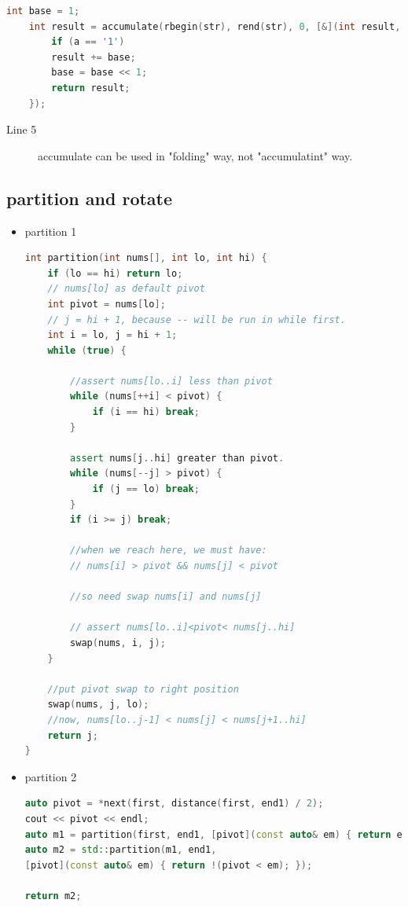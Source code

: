 \documentclass[a4paper,11pt,twoside]{book}
\begin{document}
\begin{itemize}
\begin{lstlisting}[frame=single, language=c++]
	int base = 1;
	int result = accumulate(rbegin(str), rend(str), 0, [&](int result, char a) {
		if (a == '1')
		result += base;
		base = base << 1;
		return result;
	});
\end{lstlisting}	
\begin{description}
	\item[Line 5] accumulate can be used in "folding" way, not "accumulatint" way. 
	
\end{description}	
	
	
\end{itemize}

\subsection{partition and rotate}
\begin{itemize}
		\item partition 1
\begin{lstlisting}[frame=single, language=c++]	
int partition(int nums[], int lo, int hi) {
	if (lo == hi) return lo;
	// nums[lo] as default pivot
	int pivot = nums[lo];
	// j = hi + 1, because -- will be run in while first.
	int i = lo, j = hi + 1;
	while (true) {

		//assert nums[lo..i] less than pivot
		while (nums[++i] < pivot) {
			if (i == hi) break;
		}

		assert nums[j..hi] greater than pivot.
		while (nums[--j] > pivot) {
			if (j == lo) break;
		}
		if (i >= j) break;

		//when we reach here, we must have:
		// nums[i] > pivot && nums[j] < pivot

		//so need swap nums[i] and nums[j]

		// assert nums[lo..i]<pivot< nums[j..hi]
		swap(nums, i, j);
	}

	//put pivot swap to right position
	swap(nums, j, lo);
	//now, nums[lo..j-1] < nums[j] < nums[j+1..hi]
	return j;
}
\end{lstlisting}

		\item partition 2
\begin{lstlisting}[frame=single, language=c++]	
auto pivot = *next(first, distance(first, end1) / 2);
cout << pivot << endl;
auto m1 = partition(first, end1, [pivot](const auto& em) { return em < pivot; });
auto m2 = std::partition(m1, end1,
[pivot](const auto& em) { return !(pivot < em); });	

return m2;
\end{lstlisting}



\end{itemize}
\end{document}
